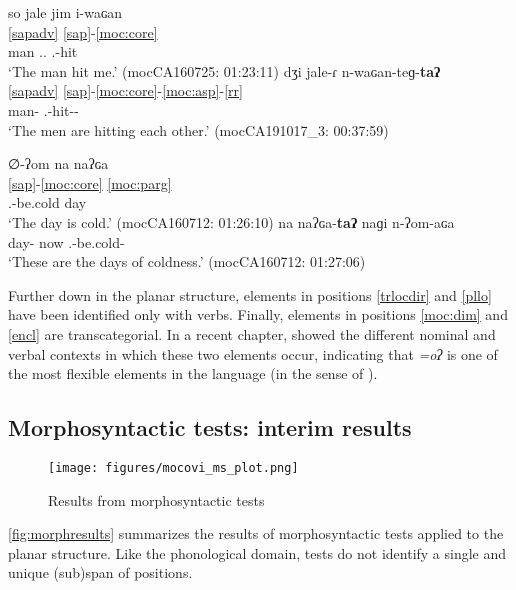 \documentclass[output=paper]{langscibook}
\begin{document}
\ea
\ea \label{exːpolicattaʔva}
\glll so jale jim i-waɢan\\
    \ref{sapadv} {} \ref{sap}-\ref{moc:core}\\
   {\DetTwo} man {\First.\Sg.\Pron} {\Third.\II}-hit\\
\glt `The man hit me.' \hfill (mocCA160725: 01:23:11)
\ex \label{ex:policattaʔvb} 
 \glll dʒi jale-ɾ n-waɢan-teɡ-\textbf{taʔ}\\
    \ref{sapadv} {} \ref{sap}-\ref{moc:core}-\ref{moc:asp}-\ref{rr}\\
   {\DetTwo} man-{\Pl} {\Third.\III}-hit-{\Prog}-{\Recp}\\
\glt `The men  are hitting each other.' \hfill (mocCA191017\_3: 00:37:59) 
\z
\z

\ea
\ea \label{exːpolicattaʔna}
\glll ∅-ʔom na naʔɢa\\
    \ref{sap}-\ref{moc:core} \ref{moc:parg} \\
   {\Third.\II}-be.cold {\DetThree} day\\
\glt `The day is cold.' \hfill (mocCA160712: 01:26:10)
\ex \label{ex:policattaʔnb} 
 \gll na naʔɢa-\textbf{taʔ} naɡi n-ʔom-aɢa\\
  {\DetThree} day-{\Pl} now {\Ind.\Poss}-be.cold-{\Nmlz} \\
\glt `These are the days of coldness.' \hfill (mocCA160712: 01:27:06)
\z
\z

 Further down in the planar structure, elements in positions \ref{trlocdir} and \ref{pllo} have  been identified only with verbs. Finally, elements in positions \ref{moc:dim} and \ref{encl} are transcategorial. In a recent chapter, \citet{Juarez2022} showed the different nominal and verbal contexts in which these two elements occur, indicating that \textit{=oʔ} is one of the most flexible elements in the language (in the sense of \citealt{Bisang2013,VanLier2013a}).      


\subsection{Morphosyntactic tests: interim results}
\begin{figure}[b]
    \centering
   \texttt{[image: figures/mocovi\_ms\_plot.png]}
    \caption{Results from morphosyntactic tests}
    \label{fig:morphresults}
\end{figure}
\autoref{fig:morphresults} summarizes the results of morphosyntactic tests applied to the planar structure. Like the phonological domain, tests do not identify a single and unique (sub)span of positions. 
\end{document}
